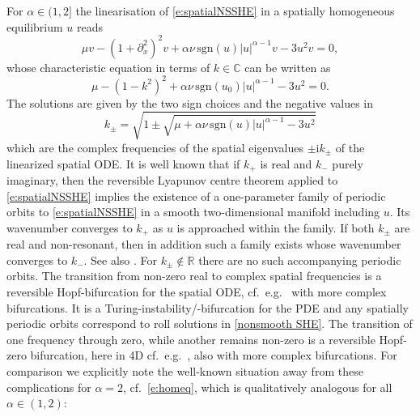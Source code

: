 \documentclass{article}
\numberwithin{equation}{section}
\def\R{\mathbb{R}}
\def\C{\mathbb{C}}
\def\rmi{\mathrm{i}}
\begin{document}
For $\alpha\in(1,2]$ the linearisation of \eqref{e:spatialNSSHE} in a spatially homogeneous equilibrium $u$ reads 
\begin{equation*}
	\mu v - (1+\partial_x^2)^2 v + \alpha\nu\, \mathrm{sgn}(u) |u|^{\alpha-1}v - 3u^2 v =0,
\end{equation*} 
whose characteristic equation in terms of $k\in\C$ can be written as
\begin{equation}\label{e:spatialNSSHEchar}
	\mu - (1-k^2)^2 + \alpha\nu\, \mathrm{sgn}(u_0) |u|^{\alpha-1} - 3u^2=0.
\end{equation}
The solutions are given by the two sign choices and the negative values in
\begin{equation}\label{e:kpm}
k_\pm = \sqrt{1 \pm \sqrt{\mu+ \alpha\nu\, \mathrm{sgn}(u) |u|^{\alpha-1} - 3u^2}}
\end{equation}
which are the complex frequencies of the spatial eigenvalues $\pm\rmi k_\pm$ of the linearized spatial ODE. It is well known that if $k_+$ is real and $k_-$ purely imaginary, then the reversible Lyapunov centre theorem \cite{MR402815} applied to \eqref{e:spatialNSSHE} implies the existence of a one-parameter family of periodic orbits to \eqref{e:spatialNSSHE} in a smooth two-dimensional manifold including $u$. Its wavenumber converges to $k_+$ as $u$ is approached within the family. If both $k_\pm$ are real and non-resonant, then in addition such a family exists whose wavenumber converges to $k_-$. See also \cite[\S 4.3.4]{HaragusIooss}. For $k_\pm\notin\R$ there are no such accompanying periodic orbits. The transition from non-zero real to complex spatial frequencies is a reversible Hopf-bifurcation for the spatial ODE, cf.\ e.g.\ \cite[\S 4.3.3]{HaragusIooss} with more complex bifurcations. It is a Turing-instability/-bifurcation for the PDE and any spatially periodic orbits correspond to roll solutions in \eqref{nonsmooth SHE}. The transition of one frequency through zero, while another remains non-zero is a reversible Hopf-zero bifurcation, here in 4D cf.\ e.g.\ \cite[\S 4.3.1]{HaragusIooss}, also with more complex bifurcations. For comparison we explicitly note the well-known situation away from these complications for $\alpha=2$, cf.\ \eqref{e:homeq}, which is qualitatively analogous for all $\alpha\in(1,2)$:
\end{document}
